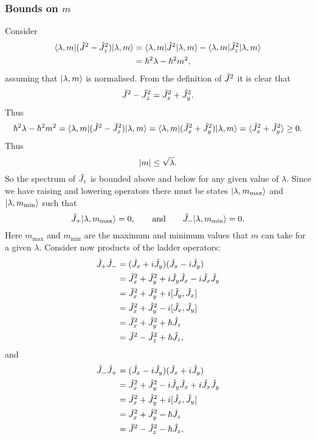 \subsubsection{Bounds on \texorpdfstring{\(m\)}{m}}\label{sec:Bounds on m}
Consider
\begin{align*}
    \langle {\lambda, m} \vert(\hat{J}^2 - \hat{J}_z^2)\vert {\lambda, m} \rangle &= \langle {\lambda, m} \vert\hat{J}^2\vert {\lambda, m} \rangle - \langle {\lambda, m} \vert\hat{J}_z^2\vert {\lambda, m} \rangle\\
    &= \hbar^2\lambda - \hbar^2m^2,
\end{align*}
assuming that \(\vert {\lambda, m} \rangle\) is normalised.
From the definition of \(\hat{J}^2\) it is clear that
\[\hat{J}^2 - \hat{J}_z^2 = \hat{J}_x^2 + \hat{J}_y^2.\]
Thus
\[\hbar^2\lambda - \hbar^2m^2 = \langle {\lambda, m} \vert(\hat{J}^2 - \hat{J}_z^2)\vert {\lambda, m} \rangle  = \langle {\lambda, m} \vert(\hat{J}_x^2 + \hat{J}_y^2)\vert {\lambda, m} \rangle = \langle{\hat{J}_x^2 + \hat{J}_y^2}\rangle \ge 0.\]
Thus
\[\abs{m} \le \sqrt{\lambda}.\]
So the spectrum of \(\hat{J}_z\) is bounded above and below for any given value of \(\lambda\).
Since we have raising and lowering operators there must be states \(\vert {\lambda, m_{\max}} \rangle\) and \(\vert {\lambda, m_{\min}} \rangle\) such that
\[\hat{J}_+\vert {\lambda, m_{\max}} \rangle = 0,\qquad\text{and}\qquad \hat{J}_-\vert {\lambda, m_{\min}} \rangle = 0.\]
Here \(m_{\max}\) and \(m_{\min}\) are the maximum and minimum values that \(m\) can take for a given \(\lambda\).
Consider now products of the ladder operators:
\begin{align*}
    \hat{J}_+\hat{J}_- &= (\hat{J}_x + i\hat{J}_y)(\hat{J}_x - i\hat{J}_y)\\
    &= \hat{J}_x^2 + \hat{J}_y^2 + i\hat{J}_y\hat{J}_x - i\hat{J}_x\hat{J}_y\\
    &= \hat{J}_x^2 + \hat{J}_y^2 + i[\hat{J}_y, \hat{J}_x]\\
    &= \hat{J}_x^2 + \hat{J}_y^2 - i[\hat{J}_x, \hat{J}_y]\\
    &= \hat{J}_x^2 + \hat{J}_y^2 + \hbar\hat{J}_z\\
    &= \hat{J}^2 - \hat{J}_z^2 + \hbar\hat{J}_z,
\end{align*}
and
\begin{align*}
    \hat{J}_-\hat{J}_+ &= (\hat{J}_x - i\hat{J}_y)(\hat{J}_x + i\hat{J}_y)\\
    &= \hat{J}_x^2 + \hat{J}_y^2 - i\hat{J}_y\hat{J}_x + i\hat{J}_x\hat{J}_y\\
    &= \hat{J}_x^2 + \hat{J}_y^2 + i[\hat{J}_x, \hat{J}_y]\\
    &= \hat{J}_x^2 + \hat{J}_y^2 - \hbar\hat{J}_z\\
    &= \hat{J}^2 - \hat{J}_z^2 - \hbar\hat{J}_z,
\end{align*}

